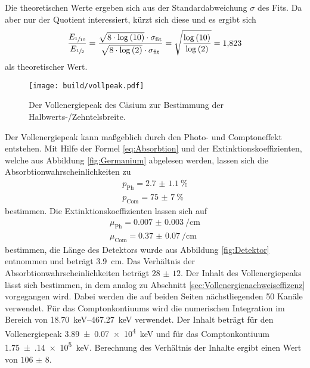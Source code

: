 Die theoretischen Werte ergeben sich aus der Standardabweichung $\sigma$ des Fits. Da aber nur der Quotient interessiert, 
kürzt sich diese und es ergibt sich
\begin{equation}
  \frac{E_{\sfrac{1}{10}}}{E_{\sfrac{1}{2}}} = \frac{\sqrt{8 \cdot \log{(10)}} \cdot \sigma_\text{fit}}{\sqrt{8 \cdot \log{(2)}} \cdot \sigma_\text{fit}} = \sqrt{\frac{\log{(10)}}{\log{(2)}}} = \num{1.823}
\end{equation}
als theoretischer Wert.
\begin{figure}[htb]
 \centering
 \texttt{[image: build/vollpeak.pdf]}
 \caption{Der Vollenergiepeak des Cäsium zur Bestimmung der Halbwerts-/Zehntelsbreite.}
 \label{fig:Halb}
\end{figure}

Der Vollenergiepeak kann maßgeblich durch den Photo- und Comptoneffekt entstehen. Mit Hilfe der Formel \ref{eq:Absorbtion} und 
der Extinktionskoeffizienten, welche aus Abbildung \ref{fig:Germanium} abgelesen werden, lassen sich die Absorbtionwahrscheinlichkeiten
zu
\begin{align*}
  p_\text{Ph} = \SI{2.7(11)}{\percent} \\
  p_\text{Com} = \SI{75(7)}{\percent}
\end{align*}
bestimmen.
Die Extinktionskoeffizienten lassen sich auf 
\begin{gather*}
  \mu_\text{Ph} = \SI{0.007(3)}{\per\centi\meter} \\
  \mu_\text{Com} = \SI{0.37(7)}{\per\centi\meter}
\end{gather*}
bestimmen, die Länge des Detektors wurde aus Abbildung \ref{fig:Detektor} entnommen und beträgt \SI{3.9}{\centi\meter}.
Das Verhältnis der Absorbtionwahrscheinlichkeiten beträgt $\num{28(12)}$.
Der Inhalt des Vollenergiepeaks lässt sich bestimmen, in dem analog zu Abschnitt \ref{sec:Vollenergienachweiseffizenz} 
vorgegangen wird. Dabei werden die auf beiden Seiten nächstliegenden \num{50} Kanäle verwendet.
Für das Comptonkontiuums wird die numerischen Integration im Bereich von
\SIrange{18.70}{467.27}{\kilo\electronvolt} verwendet. Der Inhalt beträgt für den
Vollenergiepeak \SI{3.89(7)e4}{\kilo\electronvolt} und für das Comptonkontiuum \SI{1.75(14)e5}{\kilo\electronvolt}. 
Berechnung des Verhältnis der Inhalte ergibt einen Wert von $\num{106(8)}$.
\FloatBarrier

